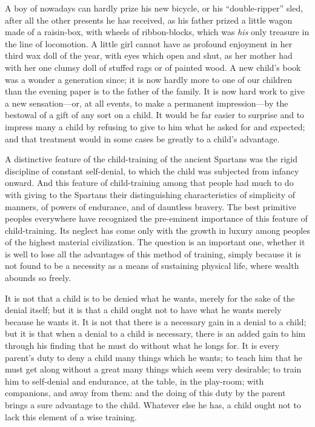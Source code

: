 \documentclass[
]{book}
\begin{document}
A boy of nowadays can hardly prize his new bicycle, or his ``double-ripper'' sled, after all the other presents he has received, as his father prized a little wagon made of a raisin-box, with wheels of ribbon-blocks, which was \emph{his} only treasure in the line of locomotion. A little girl cannot have as profound enjoyment in her third wax doll of the year, with eyes which open and shut, as her mother had with her one clumsy doll of stuffed rags or of painted wood. A new child's book was a wonder a generation since; it is now hardly more to one of our children than the evening paper is to the father of the family. It is now hard work to give a new sensation---or, at all events, to make a permanent impression---by the bestowal of a gift of any sort on a child. It would be far easier to surprise and to impress many a child by refusing to give to him what he asked for and expected; and that treatment would in some cases be greatly to a child's advantage.

A distinctive feature of the child-training of the ancient Spartans was the rigid discipline of constant self-denial, to which the child was subjected from infancy onward. And this feature of child-training among that people had much to do with giving to the Spartans their distinguishing characteristics of simplicity of manners, of powers of endurance, and of dauntless bravery. The best primitive peoples everywhere have recognized the pre-eminent importance of this feature of child-training. Its neglect has come only with the growth in luxury among peoples of the highest material civilization. The question is an important one, whether it is well to lose all the advantages of this method of training, simply because it is not found to be a necessity as a means of sustaining physical life, where wealth abounds so freely.

It is not that a child is to be denied what he wants, merely for the sake of the denial itself; but it is that a child ought not to have what he wants merely because he wants it. It is not that there is a necessary gain in a denial to a child; but it is that when a denial to a child is necessary, there is an added gain to him through his finding that he must do without what he longs for. It is every parent's duty to deny a child many things which he wants; to teach him that he must get along without a great many things which seem very desirable; to train him to self-denial and endurance, at the table, in the play-room; with companions, and away from them: and the doing of this duty by the parent brings a sure advantage to the child. Whatever else he has, a child ought not to lack this element of a wise training.
\end{document}
